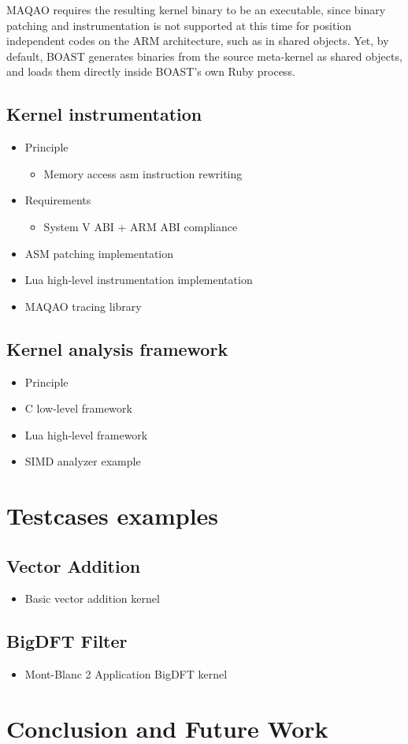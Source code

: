 \documentclass[11pt, a4paper, twoside]{montblanc2}
\begin{document}
MAQAO requires the resulting kernel binary to be an executable, since binary patching and 
instrumentation is not supported at this time for position independent codes on the ARM 
architecture, such as in shared objects. Yet, by default, BOAST generates binaries from the source 
meta-kernel as shared objects, and loads them directly inside BOAST's own Ruby process. 

\subsection{Kernel instrumentation}

\begin{itemize}
  \item Principle
    \begin{itemize}
      \item Memory access asm instruction rewriting
    \end{itemize}
  \item Requirements
    \begin{itemize}
      \item System V ABI + ARM ABI compliance
    \end{itemize}
  \item ASM patching implementation
  \item Lua high-level instrumentation implementation
  \item MAQAO tracing library
\end{itemize}

\subsection{Kernel analysis framework}

\begin{itemize}
  \item Principle
  \item C low-level framework
  \item Lua high-level framework
  \item SIMD analyzer example
\end{itemize}

\section{Testcases examples}

  \subsection{Vector Addition}
\begin{itemize}
  \item Basic vector addition kernel
\end{itemize}

  \subsection{BigDFT Filter}
\begin{itemize}
  \item Mont-Blanc 2 Application BigDFT kernel
\end{itemize}

\section{Conclusion and Future Work}



\end{document}
